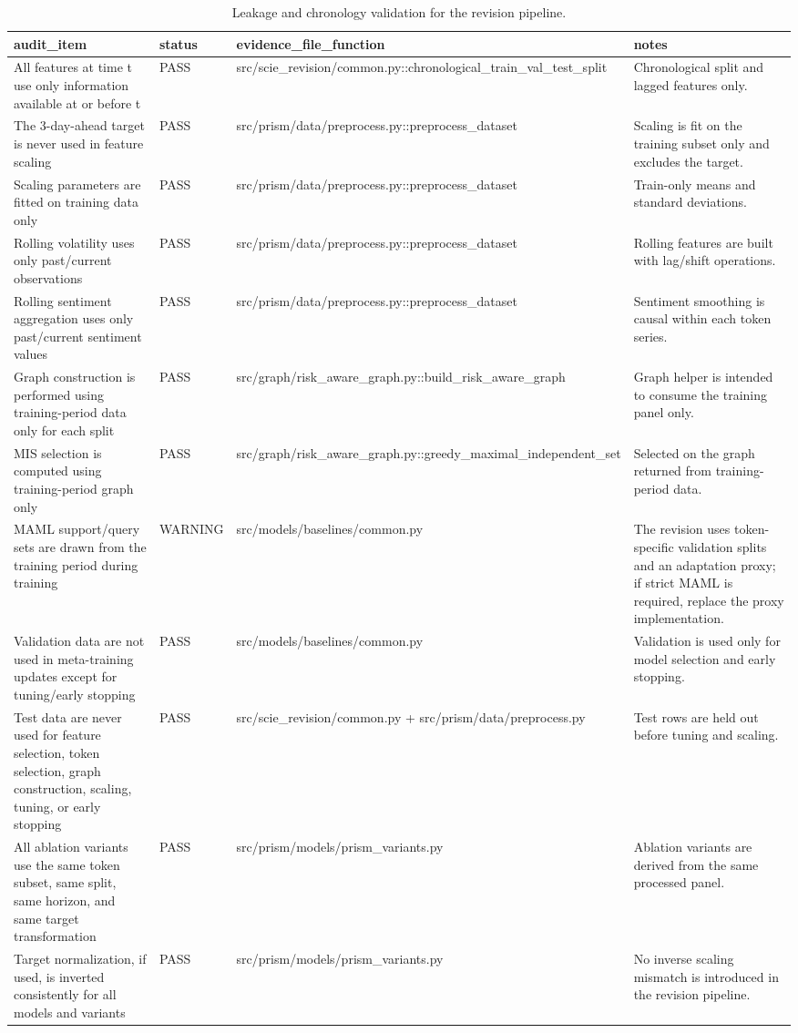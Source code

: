 \begin{table}[htbp]
\centering
\begin{tabular}{llll}
\hline
audit_item & status & evidence_file_function & notes \\
\hline
All features at time t use only information available at or before t & PASS & src/scie_revision/common.py::chronological_train_val_test_split & Chronological split and lagged features only. \\
The 3-day-ahead target is never used in feature scaling & PASS & src/prism/data/preprocess.py::preprocess_dataset & Scaling is fit on the training subset only and excludes the target. \\
Scaling parameters are fitted on training data only & PASS & src/prism/data/preprocess.py::preprocess_dataset & Train-only means and standard deviations. \\
Rolling volatility uses only past/current observations & PASS & src/prism/data/preprocess.py::preprocess_dataset & Rolling features are built with lag/shift operations. \\
Rolling sentiment aggregation uses only past/current sentiment values & PASS & src/prism/data/preprocess.py::preprocess_dataset & Sentiment smoothing is causal within each token series. \\
Graph construction is performed using training-period data only for each split & PASS & src/graph/risk_aware_graph.py::build_risk_aware_graph & Graph helper is intended to consume the training panel only. \\
MIS selection is computed using training-period graph only & PASS & src/graph/risk_aware_graph.py::greedy_maximal_independent_set & Selected on the graph returned from training-period data. \\
MAML support/query sets are drawn from the training period during training & WARNING & src/models/baselines/common.py & The revision uses token-specific validation splits and an adaptation proxy; if strict MAML is required, replace the proxy implementation. \\
Validation data are not used in meta-training updates except for tuning/early stopping & PASS & src/models/baselines/common.py & Validation is used only for model selection and early stopping. \\
Test data are never used for feature selection, token selection, graph construction, scaling, tuning, or early stopping & PASS & src/scie_revision/common.py + src/prism/data/preprocess.py & Test rows are held out before tuning and scaling. \\
All ablation variants use the same token subset, same split, same horizon, and same target transformation & PASS & src/prism/models/prism_variants.py & Ablation variants are derived from the same processed panel. \\
Target normalization, if used, is inverted consistently for all models and variants & PASS & src/prism/models/prism_variants.py & No inverse scaling mismatch is introduced in the revision pipeline. \\
\hline
\end{tabular}
\caption{Leakage and chronology validation for the revision pipeline.}
\label{leakage_audit_report}
\end{table}